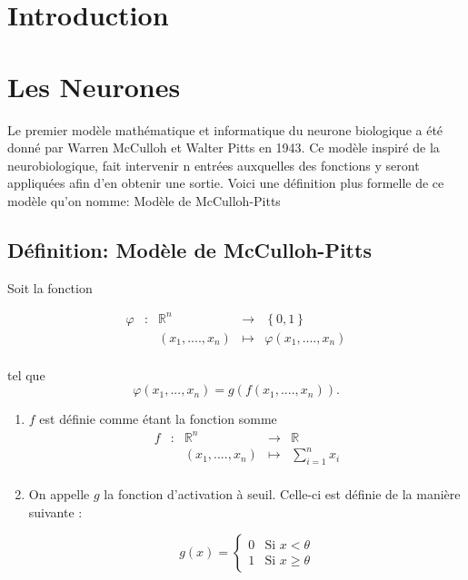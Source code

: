 \documentclass{article}
\newcommand{\fonction}[5]{
	\begin{array}{ccccc}
#1 & : & #2 & \to & #3\\
	& & #4 & \mapsto & #5\\ 
	\end{array}
}
\begin{document}
\section{Introduction}
\newpage

\section[Titre plus court]{Les Neurones}
Le premier modèle mathématique et informatique du neurone biologique a été donné par Warren McCulloh et Walter Pitts en 1943.
Ce modèle inspiré de la neurobiologique, fait intervenir n entrées auxquelles des fonctions y seront appliquées afin d'en obtenir une sortie.
Voici une définition plus formelle de ce modèle qu'on nomme: Modèle de McCulloh-Pitts     

\subsection{Définition: Modèle de McCulloh-Pitts}
	Soit la fonction  

	\[\fonction{\varphi}{\mathbb{R}^n}{\left\{0,1\right\}}{(x_1,....,x_n)}{\varphi(x_1,....,x_n)} \]

	tel que  
	\[\varphi (x_1,...,x_n) = g(f(x_1,....,x_n)). \]  

	\begin{enumerate}
		\item $f$ est définie comme étant la fonction somme 
		\[\fonction{f}{\mathbb{R}^n}{\mathbb{R}}{(x_1,....,x_n)}{\sum_{i=1}^{n} {x_i}} \] 
		\item On appelle $g$ la fonction d'activation à seuil. Celle-ci est définie de la manière suivante :

		\[g(x) = \begin{cases} 0 &\mbox{Si } x < \theta \\
				 1 & \mbox{Si } x \geq \theta
	 		 \end{cases} 
		\]
	\end{enumerate}


\vfill
\begin{center}
\end{center}
\vfill
\end{document}
